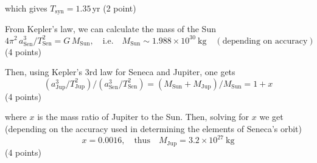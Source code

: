 \begin{description}
  which gives $T_{\mathrm{syn}} = 1.35$\,yr \hfill(2 point)

\item[(3)] From Kepler's law, we can calculate the mass of the Sun
  \[ 4\pi^2\, a_{\mathrm{Sen}}^{3}/T_{\mathrm{Sen}}^{2} = G\,M_{\mathrm{Sun}},
     \quad\text{i.e.}\quad
     M_{\mathrm{Sun}} \sim 1.988\times10^{30}\ \mathrm{kg}
     \quad(\text{depending on accuracy}) \]
  \hfill(4 points)

  Then, using Kepler's 3rd law for Seneca and Jupiter, one gets
  \[ \left(a_{\mathrm{Jup}}^{3}/T_{\mathrm{Jup}}^{2}\right) \big/
     \left(a_{\mathrm{Sen}}^{3}/T_{\mathrm{Sen}}^{2}\right)
     = \left(M_{\mathrm{Sun}} + M_{\mathrm{Jup}}\right)/M_{\mathrm{Sun}}
     = 1 + x \]
  \hfill(4 points)

  where $x$ is the mass ratio of Jupiter to the Sun. Then, solving for $x$ we
  get (depending on the accuracy used in determining the elements of Seneca's
  orbit)
  \[ x = 0.0016, \quad\text{thus}\quad
     M_{\mathrm{Jup}} = 3.2\times10^{27}\ \mathrm{kg} \]
  \hfill(4 points)
\end{description}

